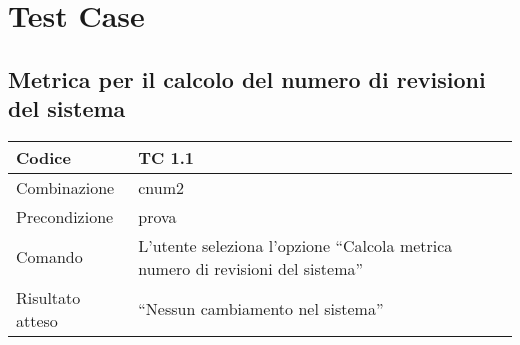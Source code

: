 \chapter{Test Case}

\section{Metrica per il calcolo del numero di revisioni del sistema}

\begin{table}[ht]
\begin{tabular}{|p{3cm}|p{9cm}|}
\hline
\cellcolor{lightgray}Codice	&	TC 1.1											\\
\hline
\cellcolor{lightgray}Combinazione		& cnum2									\\
\hline
\cellcolor{lightgray}Precondizione		& prova									\\
\hline
\cellcolor{lightgray}Comando			& L'utente seleziona l'opzione ``Calcola metrica numero di revisioni del sistema''	\\
\hline
\cellcolor{lightgray}Risultato atteso	& ``Nessun cambiamento nel sistema''	\\
\hline
\end{tabular}
\end{table}

\clearpage
